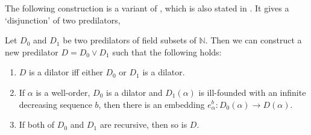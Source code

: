 \documentclass{mhkr}
\newcommand{\added}[1]{#1}
\newcommand{\bbN}{\mathbb{N}}
\newcommand{\ACA}{\mathsf{ACA}}
\begin{document}
The following construction is a variant of \cite[Lemma 5.2]{PakhomovWalsh2023omegaReflection}, which is also stated in \cite[Proposition 23]{AguileraPakhomov2023Pi13spectrum}. \added{It} gives a `disjunction' of two predilators, 
\begin{lemma}[$\ACA_0$] \label{Lemma: Disjunctive join of two predilators}
    Let $D_0$ and $D_1$ be two predilators of field subsets of $\bbN$. Then we can construct a new predilator $D=D_0\lor D_1$ such that the following holds:
    \begin{enumerate}
        \item $D$ is a dilator iff either $D_0$ or $D_1$ is a dilator.
        \item If $\alpha$ is a well-order, $D_0$ is a dilator and $D_1(\alpha)$ is ill-founded with an infinite decreasing sequence $b$, then there is an embedding $e^b_\alpha \colon D_0(\alpha)\to D(\alpha)$.
        \item If both of $D_0$ and $D_1$ are recursive, then so is $D$.
    \end{enumerate}
\end{lemma}
\end{document}
